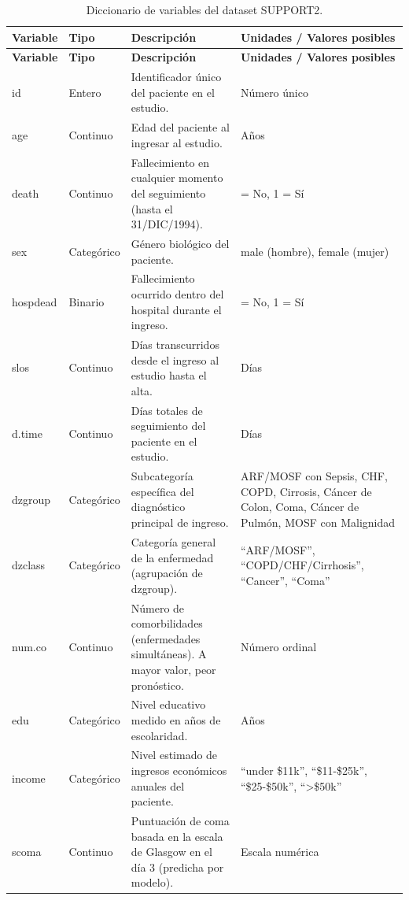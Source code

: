 \begingroup
\small
\setlength{\tabcolsep}{3pt}
\begin{longtable}{>{\raggedright\arraybackslash}p{2.1cm}>{\raggedright\arraybackslash}p{1.8cm}>{\raggedright\arraybackslash}p{7.0cm}>{\raggedright\arraybackslash}p{3.2cm}}
\caption{Diccionario de variables del dataset SUPPORT2.}\label{tab:diccionario-support2}\\
\toprule
\textbf{Variable} & \textbf{Tipo} & \textbf{Descripción} & \textbf{Unidades / Valores posibles} \\
\midrule
\endfirsthead
\toprule
\textbf{Variable} & \textbf{Tipo} & \textbf{Descripción} & \textbf{Unidades / Valores posibles} \\
\midrule
\endhead
id & Entero & Identificador único del paciente en el estudio. & Número único \\
age & Continuo & Edad del paciente al ingresar al estudio. & Años \\
death & Continuo & Fallecimiento en cualquier momento del seguimiento (hasta el 31/DIC/1994). & 0 = No, 1 = Sí \\
sex & Categórico & Género biológico del paciente. & male (hombre), female (mujer) \\
hospdead & Binario & Fallecimiento ocurrido dentro del hospital durante el ingreso. & 0 = No, 1 = Sí \\
slos & Continuo & Días transcurridos desde el ingreso al estudio hasta el alta. & Días \\
d.time & Continuo & Días totales de seguimiento del paciente en el estudio. & Días \\
dzgroup & Categórico & Subcategoría específica del diagnóstico principal de ingreso. & ARF/MOSF con Sepsis, CHF, COPD, Cirrosis, Cáncer de Colon, Coma, Cáncer de Pulmón, MOSF con Malignidad \\
dzclass & Categórico & Categoría general de la enfermedad (agrupación de dzgroup). & ``ARF/MOSF'', ``COPD/CHF/Cirrhosis'', ``Cancer'', ``Coma'' \\
num.co & Continuo & Número de comorbilidades (enfermedades simultáneas). A mayor valor, peor pronóstico. & Número ordinal \\
edu & Categórico & Nivel educativo medido en años de escolaridad. & Años \\
income & Categórico & Nivel estimado de ingresos económicos anuales del paciente. & ``under \$11k'', ``\$11-\$25k'', ``\$25-\$50k'', ``>\$50k'' \\
scoma & Continuo & Puntuación de coma basada en la escala de Glasgow en el día 3 (predicha por modelo). & Escala numérica \\

\end{longtable}
